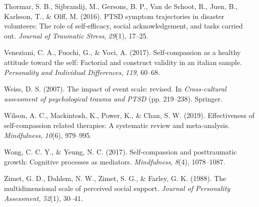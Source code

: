 \documentclass[
  man]{apa7}
\newlength{\cslhangindent}
\newlength{\cslentryspacingunit} %
\newenvironment{CSLReferences}[2] %
 {%
  \setlength{\parindent}{0pt}
  \ifodd #1
  \let\oldpar\par
  \def\par{\hangindent=\cslhangindent\oldpar}
  \fi
  \setlength{\parskip}{#2\cslentryspacingunit}
 }%
 {}
\begin{document}
\begin{CSLReferences}{1}{0}
\leavevmode{}%
Thormar, S. B., Sijbrandij, M., Gersons, B. P., Van de Schoot, R., Juen, B., Karlsson, T., \& Olff, M. (2016). PTSD symptom trajectories in disaster volunteers: The role of self-efficacy, social acknowledgement, and tasks carried out. \emph{Journal of Traumatic Stress}, \emph{29}(1), 17--25.

\leavevmode{}%
Veneziani, C. A., Fuochi, G., \& Voci, A. (2017). Self-compassion as a healthy attitude toward the self: Factorial and construct validity in an italian sample. \emph{Personality and Individual Differences}, \emph{119}, 60--68.

\leavevmode{}%
Weiss, D. S. (2007). The impact of event scale: revised. In \emph{Cross-cultural assessment of psychological trauma and PTSD} (pp. 219--238). Springer.

\leavevmode{}%
Wilson, A. C., Mackintosh, K., Power, K., \& Chan, S. W. (2019). Effectiveness of self-compassion related therapies: A systematic review and meta-analysis. \emph{Mindfulness}, \emph{10}(6), 979--995.

\leavevmode{}%
Wong, C. C. Y., \& Yeung, N. C. (2017). Self-compassion and posttraumatic growth: Cognitive processes as mediators. \emph{Mindfulness}, \emph{8}(4), 1078--1087.

\leavevmode{}%
Zimet, G. D., Dahlem, N. W., Zimet, S. G., \& Farley, G. K. (1988). The multidimensional scale of perceived social support. \emph{Journal of Personality Assessment}, \emph{52}(1), 30--41.

\end{CSLReferences}
\end{document}
